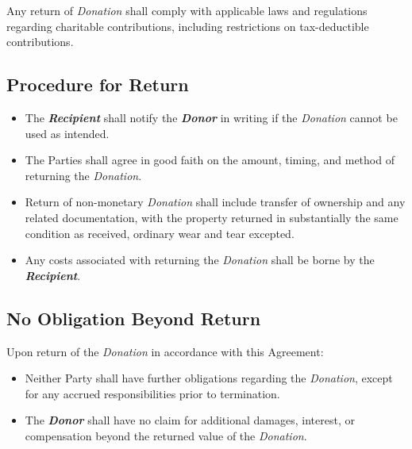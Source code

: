 \vspace{0.3cm}

\noindent Any return of \textit{Donation} shall comply with applicable laws and regulations regarding charitable contributions, including restrictions on tax-deductible contributions.

\subsection{Procedure for Return}
\begin{itemize}
  \item The \textbf{\textit{Recipient}} shall notify the \textbf{\textit{Donor}} in writing if the \textit{Donation} cannot be used as intended.
  \item The Parties shall agree in good faith on the amount, timing, and method of returning the \textit{Donation}.
  \item Return of non-monetary \textit{Donation} shall include transfer of ownership and any related documentation, with the property returned in substantially the same condition as received, ordinary wear and tear excepted.
  \item Any costs associated with returning the \textit{Donation} shall be borne by the \textbf{\textit{Recipient}}.
\end{itemize}

\subsection{No Obligation Beyond Return}
Upon return of the \textit{Donation} in accordance with this Agreement:
\begin{itemize}
  \item Neither Party shall have further obligations regarding the \textit{Donation}, except for any accrued responsibilities prior to termination.
  \item The \textbf{\textit{Donor}} shall have no claim for additional damages, interest, or compensation beyond the returned value of the \textit{Donation}.
\end{itemize}
